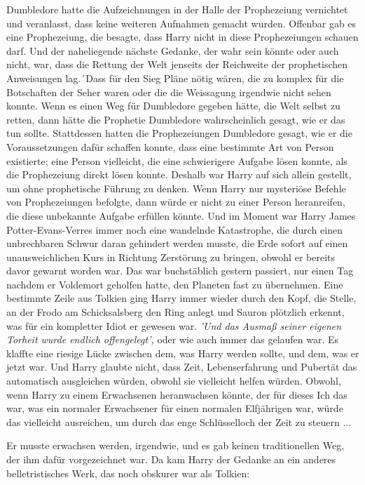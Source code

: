Dumbledore hatte die Aufzeichnungen in der Halle der Prophezeiung vernichtet und
veranlasst, dass keine weiteren Aufnahmen gemacht wurden. Offenbar gab es eine
Prophezeiung, die besagte, dass Harry nicht in diese Prophezeiungen schauen
darf. Und der naheliegende nächste Gedanke, der wahr sein könnte oder auch
nicht, war, dass die Rettung der Welt jenseits der Reichweite der prophetischen
Anweisungen lag.´Dass für den Sieg Pläne nötig wären, die zu komplex für die
Botschaften der Seher waren oder die die Weissagung irgendwie nicht sehen
konnte. Wenn es einen Weg für Dumbledore gegeben hätte, die Welt selbst zu
retten, dann hätte die Prophetie Dumbledore wahrscheinlich gesagt, wie er das
tun sollte. Stattdessen hatten die Prophezeiungen Dumbledore gesagt, wie er die
Voraussetzungen dafür schaffen konnte, dass eine bestimmte Art von Person
existierte; eine Person vielleicht, die eine schwierigere Aufgabe lösen konnte,
als die Prophezeiung direkt lösen konnte. Deshalb war Harry auf sich allein
gestellt, um ohne prophetische Führung zu denken. Wenn Harry nur mysteriöse
Befehle von Prophezeiungen befolgte, dann würde er nicht zu einer Person
heranreifen, die diese unbekannte Aufgabe erfüllen könnte. Und im Moment war
Harry James Potter-Evans-Verres immer noch eine wandelnde Katastrophe, die durch
einen unbrechbaren Schwur daran gehindert werden musste, die Erde sofort auf
einen unausweichlichen Kurs in Richtung Zerstörung zu bringen, obwohl er bereits
davor gewarnt worden war. Das war buchstäblich gestern passiert, nur einen Tag
nachdem er Voldemort geholfen hatte, den Planeten fast zu übernehmen. Eine
bestimmte Zeile aus Tolkien ging Harry immer wieder durch den Kopf, die Stelle,
an der Frodo am Schicksalsberg den Ring anlegt und Sauron plötzlich erkennt, was
für ein kompletter Idiot er gewesen war.
\emph{'Und das Ausmaß seiner eigenen Torheit wurde endlich offengelegt',}
oder wie auch immer das gelaufen war. Es klaffte eine riesige Lücke zwischen
dem, was Harry werden sollte, und dem, was er jetzt war. Und Harry glaubte
nicht, dass Zeit, Lebenserfahrung und Pubertät das automatisch ausgleichen
würden, obwohl sie vielleicht helfen würden. Obwohl, wenn Harry zu einem
Erwachsenen heranwachsen könnte, der für dieses Ich das war, was ein normaler
Erwachsener für einen normalen Elfjährigen war, würde das vielleicht ausreichen,
um durch das enge Schlüsselloch der Zeit zu steuern ...

Er musste erwachsen werden, irgendwie, und es gab keinen traditionellen Weg, der
ihm dafür vorgezeichnet war. Da kam Harry der Gedanke an ein anderes
belletristisches Werk, das noch obskurer war als Tolkien:

